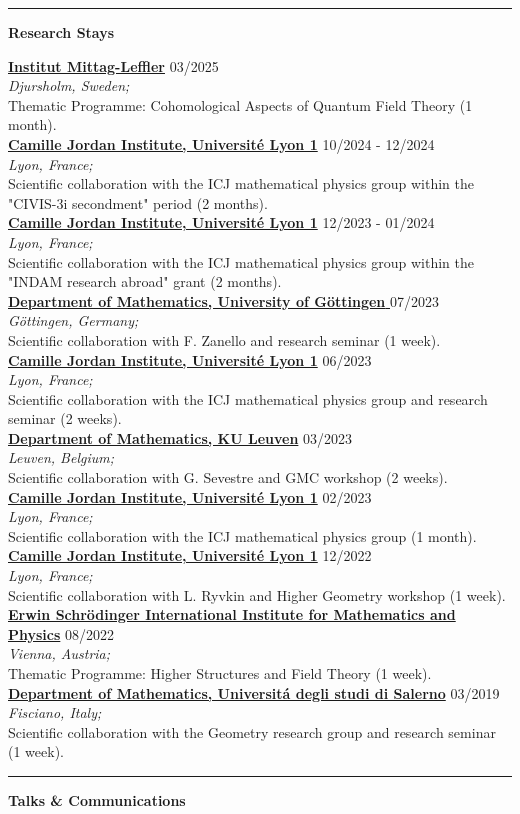 \documentclass[a4paper]{article}
\newcommand{\block}[1]{\hrule \vspace{0.2cm} \textbf{\Large #1} \vspace{0.2cm}}
\newcommand{\voice}[5]{\href{#4}{\textbf{#1}} \hfill #2 \\ \textit{#3} \\ {\small #5} \vspace{0.2cm} \\}
\begin{document}
	\block{Research Stays}

	\voice{Institut Mittag-Leffler}
		{03/2025}
		{Djursholm, Sweden;}
		{https://www.mittag-leffler.se/activities/cohomological-aspects-of-quantum-field-theory/}       
		{Thematic Programme: Cohomological Aspects of Quantum Field Theory (1 month).}
	\voice{Camille Jordan Institute, Université Lyon 1}
		{10/2024 - 12/2024}
		{Lyon, France;}
		{None}       
		{Scientific collaboration with the ICJ mathematical physics group within the "CIVIS-3i secondment" period (2 months).}
	\voice{Camille Jordan Institute, Université Lyon 1}
		{12/2023 - 01/2024}
		{Lyon, France;}
		{None}       
		{Scientific collaboration with the ICJ mathematical physics group within the "INDAM research abroad" grant (2 months).}
	\voice{Department of Mathematics, University of Göttingen }
		{07/2023}
		{Göttingen, Germany;}
		{None}       
		{Scientific collaboration with F. Zanello and research seminar (1 week).}
	\voice{Camille Jordan Institute, Université Lyon 1}
		{06/2023}
		{Lyon, France;}
		{None}       
		{Scientific collaboration with the ICJ mathematical physics group and research seminar (2 weeks).}
	\voice{Department of Mathematics, KU Leuven}
		{03/2023}
		{Leuven, Belgium;}
		{None}       
		{Scientific collaboration with G. Sevestre and GMC workshop (2 weeks).}
	\voice{Camille Jordan Institute, Université Lyon 1}
		{02/2023}
		{Lyon, France;}
		{None}       
		{Scientific collaboration with the ICJ mathematical physics group (1 month).}
	\voice{Camille Jordan Institute, Université Lyon 1}
		{12/2022}
		{Lyon, France;}
		{None}       
		{Scientific collaboration with L. Ryvkin and Higher Geometry workshop (1 week).}
	\voice{Erwin Schrödinger International Institute for Mathematics and Physics}
		{08/2022}
		{Vienna, Austria;}
		{https://www.esi.ac.at/events/e430/}       
		{Thematic Programme: Higher Structures and Field Theory (1 week).}
	\voice{Department of Mathematics, Universit\'a degli studi di Salerno}
		{03/2019}
		{Fisciano, Italy;}
		{http://geometria.dipmat.unisa.it/events.html}       
		{Scientific collaboration with the Geometry research group and research seminar (1 week).}

	\block{Talks \& Communications}
\end{document}
